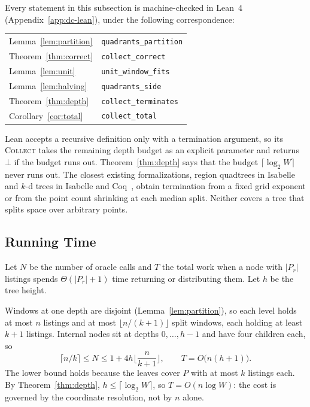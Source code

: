 Every statement in this subsection is machine-checked in Lean~4~\cite{lean4}
(Appendix~\ref{app:dc-lean}), under the following correspondence:
\begin{center}\small
\begin{tabular}{@{}ll@{}}
Lemma~\ref{lem:partition} & \texttt{quadrants\_partition}\\
Theorem~\ref{thm:correct} & \texttt{collect\_correct}\\
Lemma~\ref{lem:unit} & \texttt{unit\_window\_fits}\\
Lemma~\ref{lem:halving} & \texttt{quadrants\_side}\\
Theorem~\ref{thm:depth} & \texttt{collect\_terminates}\\
Corollary~\ref{cor:total} & \texttt{collect\_total}
\end{tabular}
\end{center}
Lean accepts a recursive
definition only with a termination argument, so its \textsc{Collect} takes
the remaining depth budget as an explicit parameter and returns $\bot$ if the
budget runs out. Theorem~\ref{thm:depth} says that the budget
$\lceil\log_2 W\rceil$ never runs out. The closest existing formalizations,
region quadtrees in Isabelle~\cite{nipkow2024quad,nipkow2024afp} and $k$-d
trees in Isabelle and Coq~\cite{rau2019kdtree,hamid2023kdtree}, obtain
termination from a fixed grid exponent or from the point count shrinking at
each median split. Neither covers a tree that splits space over arbitrary
points.

\subsection{Running Time}
\label{sec:dc-analysis}

Let $N$ be the number of oracle calls and $T$ the total work when a node with
$|P_r|$ listings spends $\Theta(|P_r|+1)$ time returning or distributing them.
Let $h$ be the tree height.

Windows at one depth are disjoint (Lemma~\ref{lem:partition}), so each level
holds at most $n$ listings and at most $\lfloor n/(k+1)\rfloor$ split windows,
each holding at least $k+1$ listings. Internal nodes sit at depths
$0,\dots,h-1$ and have four children each, so
\begin{equation}
\lceil n/k\rceil\le N\le 1+4h\Big\lfloor\frac{n}{k+1}\Big\rfloor,
\qquad T=O\big(n(h+1)\big).
\label{eq:general}
\end{equation}
The lower bound holds because the leaves cover $P$ with at most $k$ listings
each. By Theorem~\ref{thm:depth}, $h\le\lceil\log_2 W\rceil$, so
$T=O(n\log W)$: the cost is governed by the coordinate resolution, not by $n$
alone.

